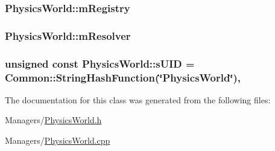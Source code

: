 \subsubsection[{\texorpdfstring{m\+Registry}{mRegistry}}]{ Physics\+World\+::m\+Registry\hspace{0.3cm}{\ttfamily [private]}}\hypertarget{classPhysicsWorld_ab40b28469589a03eaf2a98c9fc2b66ed}{}\label{classPhysicsWorld_ab40b28469589a03eaf2a98c9fc2b66ed}
\subsubsection[{\texorpdfstring{m\+Resolver}{mResolver}}]{ Physics\+World\+::m\+Resolver\hspace{0.3cm}{\ttfamily [private]}}\hypertarget{classPhysicsWorld_a4552553bfba7d42255493b036893c0c5}{}\label{classPhysicsWorld_a4552553bfba7d42255493b036893c0c5}
\subsubsection[{\texorpdfstring{s\+U\+ID}{sUID}}]{\setlength{\rightskip}{0pt plus 5cm}unsigned const Physics\+World\+::s\+U\+ID = {\bf Common\+::\+String\+Hash\+Function}(\char`\"{}Physics\+World\char`\"{})\hspace{0.3cm}{\ttfamily [static]}, {\ttfamily [private]}}\hypertarget{classPhysicsWorld_ac6079c51e7409d83a44c61cd346c7917}{}\label{classPhysicsWorld_ac6079c51e7409d83a44c61cd346c7917}


The documentation for this class was generated from the following files\+:\begin{DoxyCompactItemize}
\item 
Managers/\hyperlink{PhysicsWorld_8h}{Physics\+World.\+h}\item 
Managers/\hyperlink{PhysicsWorld_8cpp}{Physics\+World.\+cpp}\end{DoxyCompactItemize}
